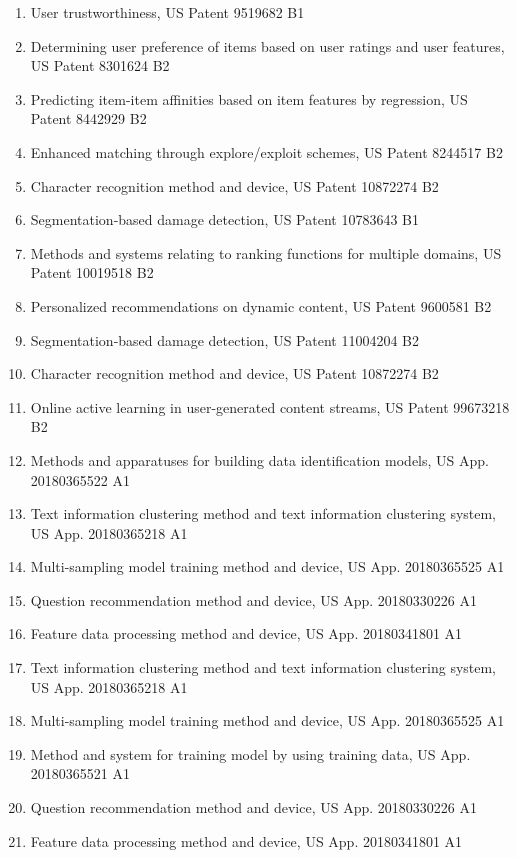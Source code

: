 \documentclass[line,10pt,final]{res}
\begin{document}
\begin{resume}
\begin{enumerate}
\item User trustworthiness, US Patent 9519682 B1
\item Determining user preference of items based on user ratings and user features, US Patent 8301624 B2
\item Predicting item-item affinities based on item features by regression, US Patent 8442929 B2
\item Enhanced matching through explore/exploit schemes, US Patent 8244517 B2
\item Character recognition method and device, US Patent 10872274 B2
\item Segmentation-based damage detection, US Patent 10783643 B1
\item Methods and systems relating to ranking functions for multiple domains, US Patent 10019518 B2
\item Personalized recommendations on dynamic content, US Patent 9600581 B2
\item Segmentation-based damage detection, US Patent 11004204 B2
\item Character recognition method and device, US Patent 10872274 B2
\item Online active learning in user-generated content streams, US Patent 99673218 B2
\item Methods and apparatuses for building data identification models, US App. 20180365522 A1
\item Text information clustering method and text information clustering system, US App. 20180365218 A1
\item Multi-sampling model training method and device, US App. 20180365525 A1
\item Question recommendation method and device, US App. 20180330226 A1
\item Feature data processing method and device, US App. 20180341801 A1
\item Text information clustering method and text information clustering system, US App. 20180365218 A1
\item Multi-sampling model training method and device, US App. 20180365525 A1
\item Method and system for training model by using training data, US App. 20180365521 A1
\item Question recommendation method and device, US App. 20180330226 A1
\item Feature data processing method and device, US App. 20180341801 A1

\end{enumerate}


\end{resume}
\end{document}

